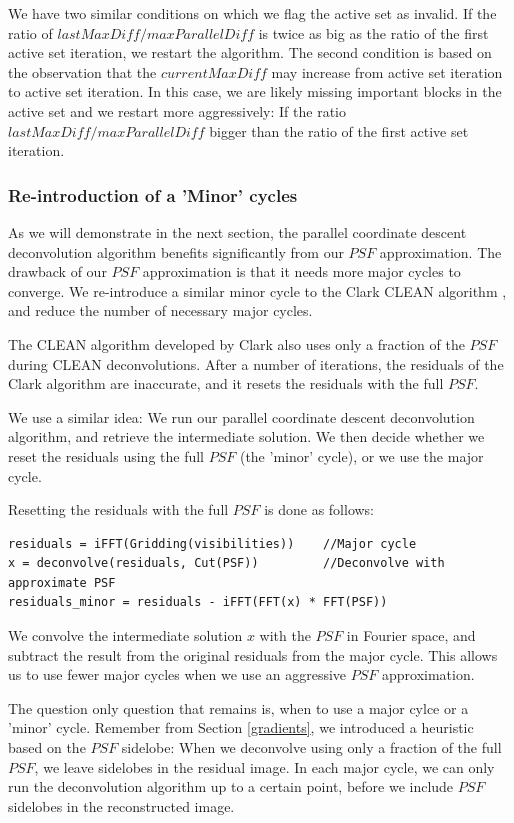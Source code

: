 We have two similar conditions on which we flag the active set as invalid. If the ratio of $lastMaxDiff / maxParallelDiff$ is twice as big as the ratio of the first active set iteration, we restart the algorithm. The second condition is based on the observation that the $currentMaxDiff$ may increase from active set iteration to active set iteration. In this case, we are likely missing important blocks in the active set and we restart more aggressively: If the ratio $lastMaxDiff / maxParallelDiff$ bigger than the ratio of the first active set iteration.


\subsubsection{Re-introduction of a 'Minor' cycles}
As we will demonstrate in the next section, the parallel coordinate descent deconvolution algorithm benefits significantly from our $PSF$ approximation. The drawback of our $PSF$ approximation is that it needs more major cycles to converge. We re-introduce a similar minor cycle to the Clark CLEAN algorithm \cite{clark1980efficient}, and reduce the number of necessary major cycles.

The CLEAN algorithm developed by Clark also uses only a fraction of the $PSF$ during CLEAN deconvolutions. After a number of iterations, the residuals of the Clark algorithm are inaccurate, and it resets the residuals with the full $PSF$.

We use a similar idea: We run our parallel coordinate descent deconvolution algorithm, and retrieve the intermediate solution. We then decide whether we reset the residuals using the full $PSF$ (the 'minor' cycle), or we use the major cycle.

Resetting the residuals with the full $PSF$ is done as follows:

\begin{lstlisting}
residuals = iFFT(Gridding(visibilities))  	//Major cycle
x = deconvolve(residuals, Cut(PSF)) 		//Deconvolve with approximate PSF
residuals_minor = residuals - iFFT(FFT(x) * FFT(PSF))
\end{lstlisting}

We convolve the intermediate solution $x$ with the $PSF$ in Fourier space, and subtract the result from the original residuals from the major cycle. This allows us to use fewer major cycles when we use an aggressive $PSF$ approximation.

The question only question that remains is, when to use a major cylce or a 'minor' cycle. Remember from Section \ref{gradients}, we introduced a heuristic based on the $PSF$ sidelobe: When we deconvolve using only a fraction of the full $PSF$, we leave sidelobes in the residual image. In each major cycle, we can only run the deconvolution algorithm up to a certain point, before we include $PSF$ sidelobes in the reconstructed image. 

